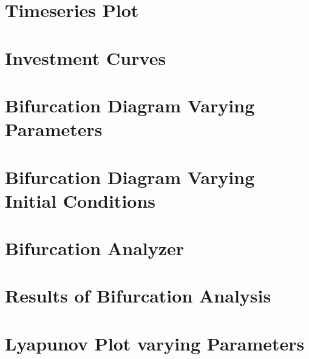 \section{Timeseries Plot}

\section{Investment Curves}

\section{Bifurcation Diagram Varying Parameters}

\section{Bifurcation Diagram Varying Initial Conditions}

\section{Bifurcation Analyzer}\label{bifurcation_analyzer}


\section{Results of Bifurcation Analysis}\label{bifurcation_analysis}


\section{Lyapunov Plot varying Parameters}

